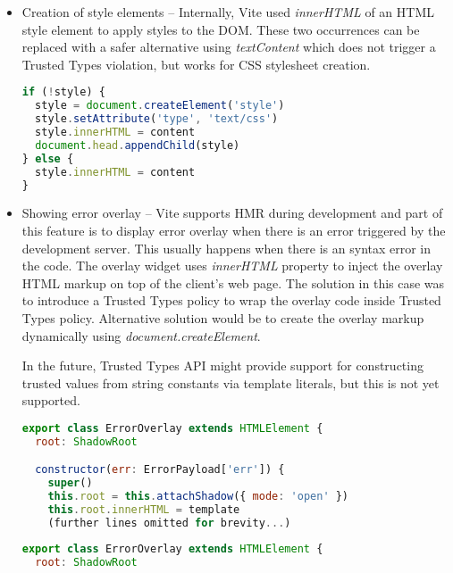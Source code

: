 \begin{itemize}
  \item Creation of style elements -- Internally, Vite used \emph{innerHTML} of an HTML style
        element to apply styles to the DOM. These two occurrences can be replaced with a
        safer alternative using \emph{textContent} which does not trigger a Trusted Types
        violation, but works for CSS stylesheet creation.

        \bigskip
        \begin{lstlisting}[language=JavaScript, caption=Creation of style elements using \emph{innerHTML} in Vite \cite{commit_vite_inner_html_styles}]
if (!style) {
  style = document.createElement('style')
  style.setAttribute('type', 'text/css')
  style.innerHTML = content
  document.head.appendChild(style)
} else {
  style.innerHTML = content
}
\end{lstlisting}

  \item Showing error overlay -- Vite supports HMR during development and part of this feature is to
        display error overlay when there is an error triggered by the development server. This
        usually happens when there is an syntax error in the code. The overlay widget uses
        \emph{innerHTML} property to inject the overlay HTML markup on top of the client's web
        page. The solution in this case was to introduce a Trusted Types policy to wrap the overlay
        code inside Trusted Types policy. Alternative solution would be to create the overlay
        markup dynamically using \emph{document.createElement}.

        In the future, Trusted Types API might provide support for constructing trusted values from
        string constants via template literals, but this is not yet supported.

        \bigskip
        \begin{lstlisting}[language=JavaScript, caption=Creation of error overlay using \emph{innerHTML} property \cite{commit_vite_inner_html_overlay}]
export class ErrorOverlay extends HTMLElement {
  root: ShadowRoot

  constructor(err: ErrorPayload['err']) {
    super()
    this.root = this.attachShadow({ mode: 'open' })
    this.root.innerHTML = template
    (further lines omitted for brevity...)
\end{lstlisting}

        \bigskip
        \begin{lstlisting}[language=JavaScript, caption=Creation of error overlay using Trusted Types policy \cite{commit_vite_policy_overlay}]
export class ErrorOverlay extends HTMLElement {
  root: ShadowRoot


\end{lstlisting}
\end{itemize}
